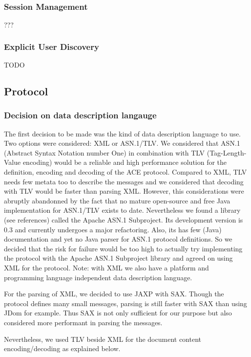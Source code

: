 \subsubsection{Session Management}
???

\subsubsection{Explicit User Discovery}
\label{chapter:network.protocol.explicituserdiscovery}
TODO



\subsection{Protocol}
\label{chapter:network.communication.protocol}
\subsubsection{Decision on data description langauge}
The first decision to be made was the kind of data description language to use. Two options were considered: XML or ASN.1/TLV. We considered that ASN.1 (Abstract Syntax Notation number One) in combination with TLV (Tag-Length-Value encoding) would be a reliable and high performance solution for the definition, encoding and decoding of the ACE protocol. Compared to XML, TLV needs few metata too to describe the messages and we considered that decoding with TLV would be faster than parsing XML. However, this considerations were abruptly abandonned by the fact that no mature open-source and free Java implementation for ASN.1/TLV exists to date. Nevertheless we found a library (see references) called the Apache ASN.1 Subproject. Its development version is 0.3 and currently undergoes a major refactoring. Also, its has few (Java) documentation and yet no Java parser for ASN.1 protocol definitions. So we decided that the risk for failure would be too high to actually try implementing the protocol with the Apache ASN.1 Subproject library and agreed on using XML for the protocol. Note: with XML we also have a platform and programming language independent data description language.

For the parsing of XML, we decided to use JAXP with SAX. Though the protocol defines many small messages, parsing is still faster with SAX than using JDom for example. Thus SAX is not only sufficient for our purpose but also considered more performant in parsing the messages.

Nevertheless, we used TLV beside XML for the document content encoding/decoding as explained below.

